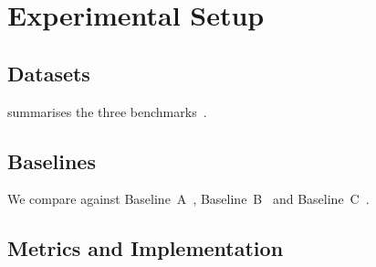 \section{Experimental Setup}\label{sec:setup}


\subsection{Datasets}\label{sec:datasets}
 summarises the three benchmarks~\parencite{placeholder-dataset}.

\begin{table}[t]
  \centering
  \caption{Dataset statistics (placeholder values).}
  \label{tab:datasets}
  
\end{table}


\subsection{Baselines}\label{sec:baselines}
We compare against Baseline~A~\parencite{placeholder-method-a}, Baseline~B~\parencite{placeholder-method-b} and Baseline~C~\parencite{placeholder-classic}.

\subsection{Metrics and Implementation}\label{sec:implementation}
